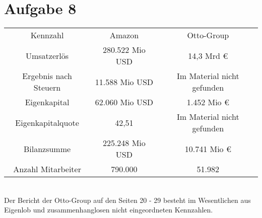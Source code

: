 \documentclass{article}
\begin{document}
	\section*{Aufgabe 8}
	\begin{tabular}[h]{c|c|c}
		Kennzahl & Amazon & Otto-Group \\
		Umsatzerlös & 280.522 Mio USD  & 14,3 Mrd € \\
		Ergebnis nach Steuern & 11.588 Mio USD & Im Material nicht gefunden \\
		Eigenkapital & 62.060 Mio USD & 1.452 Mio € \\
		Eigenkapitalquote & 42,51 & Im Material nicht gefunden \\
		Bilanzsumme & 225.248 Mio USD & 10.741 Mio €  \\
		Anzahl Mitarbeiter & 790.000 & 51.982
	\end{tabular} \\
	Der Bericht der Otto-Group auf den Seiten 20 - 29 besteht im Wesentlichen aus Eigenlob und zusammenhanglosen nicht eingeordneten Kennzahlen.
\end{document}
